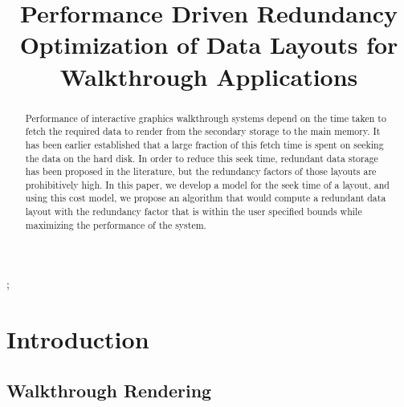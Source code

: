 \documentclass[conference]{acmsiggraph}
\title{Performance Driven Redundancy Optimization of Data Layouts for Walkthrough Applications}
\author{}
\begin{document}

\maketitle

\begin{abstract}

Performance of interactive graphics walkthrough systems depend on the time taken to fetch the required data to render from the secondary storage to the main memory. It has been earlier established that a large fraction of this fetch time is spent on seeking the data on the hard disk. In order to reduce this seek time, redundant data storage has been proposed in the literature, but the redundancy factors of those layouts are prohibitively high.  In this paper, we develop a model for the seek time of a layout, and using this cost model, we propose an algorithm that would compute a redundant data layout with the redundancy factor that is within the user specified bounds while maximizing the performance of the system.



\end{abstract}

\begin{CRcatlist}
  ;
\end{CRcatlist}

\keywordlist


\TOGlinkslist


\copyrightspace

\section{Introduction}

\subsection{Walkthrough Rendering}
\end{document}
